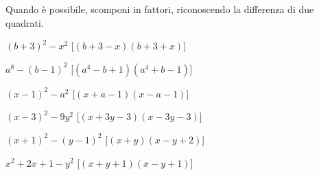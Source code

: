 
\begin{esercizio}[\Ast]
\label{ese:div.018}
Quando è possibile, scomponi in fattori, riconoscendo la differenza di due 
quadrati.
\begin{multicols}{2}
\begin{enumeratea}
 \item \((b+3)^{2}-x^{2}\) \hfill [\((b+3-x)(b+3+x)\)]
 \item \(a^{8}-(b-1)^{2}\) \hfill [\((a^{4}-b+1)(a^{4}+b-1)\)]
 \item \((x-1)^{2}-a^{2}\) \hfill [\((x+a-1)(x-a-1)\)]
 \item \((x-3)^{2}-9y^{2}\) \hfill [\((x+3y-3)(x-3y-3)\)]
 \item \((x+1)^{2}-(y-1)^{2}\) \hfill [\((x+y)(x-y+2)\)]
 \item \(x^{2}+2x+1-y^{2}\) \hfill [\((x+y+1)(x-y+1)\)]
\end{enumeratea}
\end{multicols}
\end{esercizio}

